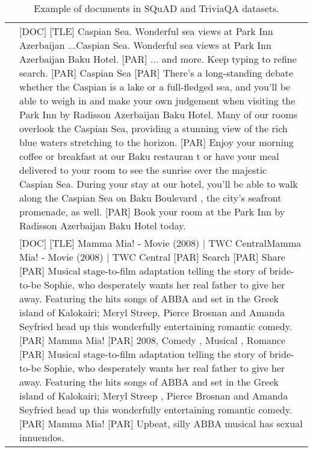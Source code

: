 \begin{table*}[h]
\begin{tabularx}{\textwidth}{|c|X|}
        \cline{2-2}
        & [DOC] [TLE] Caspian Sea. Wonderful sea views at Park Inn Azerbaijan ...Caspian Sea. Wonderful sea views at Park Inn Azerbaijan Baku Hotel. [PAR] ... and more. Keep typing to refine search. [PAR] Caspian Sea [PAR] There's a long-standing debate whether the Caspian is a lake or a full-fledged sea, and you'll be able to weigh in and make your own judgement when visiting the Park Inn by Radisson Azerbaijan Baku Hotel. Many of our rooms overlook the Caspian Sea, providing a stunning view of the rich blue waters stretching to the horizon. [PAR] Enjoy your morning coffee or breakfast at our Baku restauran t or have your meal delivered to your room to see the sunrise over the majestic Caspian Sea. During your stay at our hotel, you'll be able to walk along the Caspian Sea on Baku Boulevard , the city's seafront promenade, as well. [PAR] Book your room at the Park Inn by Radisson Azerbaijan Baku Hotel today. \\
        \cline{2-2}
        & [DOC] [TLE] Mamma Mia! - Movie (2008) | TWC CentralMamma Mia! - Movie (2008) | TWC Central [PAR] Search [PAR] Share [PAR] Musical stage-to-film adaptation telling the story of bride-to-be Sophie, who desperately wants her real father to give her away. Featuring the hits songs of ABBA and set in the Greek island of Kalokairi; Meryl Streep, Pierce Brosnan and Amanda Seyfried head up this wonderfully entertaining romantic comedy. [PAR] Mamma Mia! [PAR] 2008, Comedy , Musical , Romance [PAR] Musical stage-to-film adaptation telling the story of bride-to-be Sophie, who desperately wants her real father to give her away. Featuring the hits songs of ABBA and set in the Greek island of Kalokairi; Meryl Streep , Pierce Brosnan and Amanda Seyfried head up this wonderfully entertaining romantic comedy. [PAR] Mamma Mia! [PAR] Upbeat, silly ABBA musical has sexual innuendos.   \\
        \hline
    \end{tabularx}
    \caption{Example of documents in SQuAD and TriviaQA datasets. }
    \label{tab:example_doc}
\end{table*}